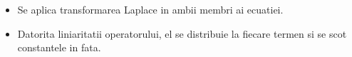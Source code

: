 \documentclass{article}
\begin{document}
\begin{itemize}
  \item  Se aplica transformarea Laplace in ambii membri ai ecuatiei.\\
  \item  Datorita liniaritatii operatorului, el se distribuie la fiecare termen si se scot constantele in fata. \\

\end{itemize}


\end{document}
